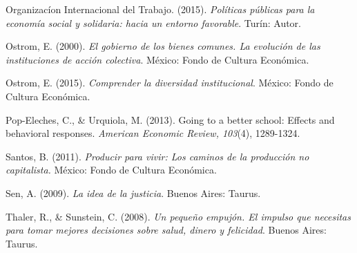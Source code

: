 \documentclass[12]{article}
\begin{document}
\begin{hangparas}{.25in}{1}
Organizacíon Internacional del Trabajo. (2015). \textit{Políticas públicas para la economía social y solidaria: hacia un entorno favorable}. Turín: Autor.  

Ostrom, E. (2000). \textit{El gobierno de los bienes comunes. La evolución de las instituciones de acción colectiva}. México: Fondo de Cultura Económica.

Ostrom, E. (2015). \textit{Comprender la diversidad institucional}. México: Fondo de Cultura Económica. 

Pop-Eleches, C., \& Urquiola, M. (2013). Going to a better school: Effects and behavioral responses.\textit{ American Economic Review, 103}(4), 1289-1324. 

Santos, B. (2011). \textit{Producir para vivir: Los caminos de la producción no capitalista.} México: Fondo de Cultura Económica.

Sen, A. (2009). \textit{La idea de la justicia}. Buenos Aires: Taurus. 

Thaler, R., \& Sunstein, C. (2008).\textit{ Un pequeño empujón. El impulso que necesitas para tomar mejores decisiones sobre salud, dinero y 
felicidad}.  Buenos Aires: Taurus. 
\end{hangparas}
\end{document}
